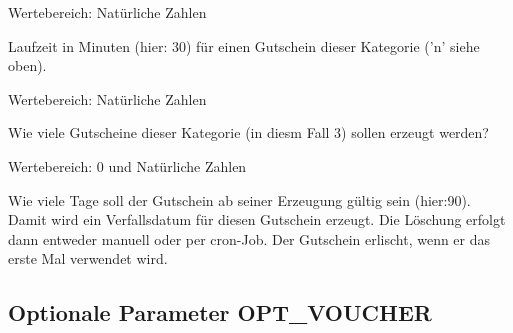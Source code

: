 \begin{description}
   
    
    Wertebereich: Natürliche Zahlen
    
  Laufzeit in Minuten (hier: 30) für einen Gutschein dieser Kategorie ('n' siehe oben).


   
   Wertebereich: Natürliche Zahlen
  
  Wie viele Gutscheine dieser Kategorie (in diesm Fall 3) sollen erzeugt werden? 
  
   
   
   Wertebereich: 0 und Natürliche Zahlen
   
  Wie viele Tage soll der Gutschein ab seiner Erzeugung gültig sein (hier:90).
  Damit wird ein Verfallsdatum für diesen Gutschein erzeugt. Die Löschung
  erfolgt dann entweder manuell oder per cron-Job. Der Gutschein erlischt,
  wenn er das erste Mal verwendet wird.
  

\end{description}

\subsection {Optionale Parameter OPT\_VOUCHER}
  
